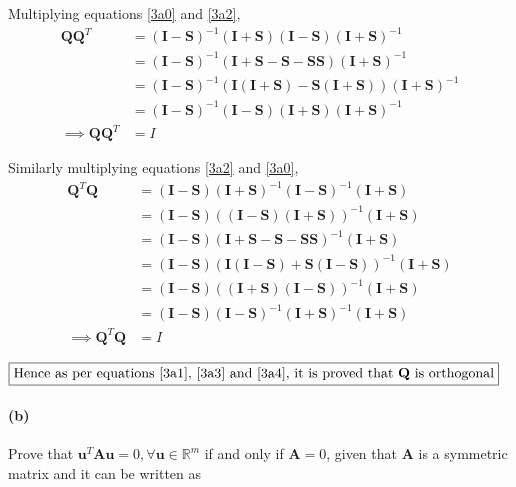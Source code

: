 \documentclass[12pt, letterpaper]{article}
\begin{document}
Multiplying equations \ref{3a0} and \ref{3a2},
\begin{equation}\label{3a3}
  \begin{split}
    \mathbf{Q}\mathbf{Q}^T
    &= (\mathbf{I} - \mathbf{S})^{-1}(\mathbf{I} + \mathbf{S})(\mathbf{I} - \mathbf{S})(\mathbf{I} + \mathbf{S})^{-1}\\
    &= (\mathbf{I} - \mathbf{S})^{-1}(\mathbf{I} + \mathbf{S} - \mathbf{S} - \mathbf{S}\mathbf{S})(\mathbf{I} + \mathbf{S})^{-1}\\
    &= (\mathbf{I} - \mathbf{S})^{-1}(\mathbf{I}(\mathbf{I} + \mathbf{S}) - \mathbf{S}(\mathbf{I} + \mathbf{S}))(\mathbf{I} + \mathbf{S})^{-1}\\
    &= (\mathbf{I} - \mathbf{S})^{-1}(\mathbf{I} - \mathbf{S})(\mathbf{I} + \mathbf{S})(\mathbf{I} + \mathbf{S})^{-1}\\
    \implies \mathbf{QQ}^T &= I
  \end{split}
\end{equation}

Similarly multiplying equations \ref{3a2} and \ref{3a0},
\begin{equation}\label{3a4}
  \begin{split}
    \mathbf{Q}^T\mathbf{Q}
    &= (\mathbf{I} - \mathbf{S})(\mathbf{I} + \mathbf{S})^{-1}(\mathbf{I} - \mathbf{S})^{-1}(\mathbf{I} + \mathbf{S})\\
    &= (\mathbf{I} - \mathbf{S})((\mathbf{I} - \mathbf{S})(\mathbf{I} + \mathbf{S}))^{-1}(\mathbf{I} + \mathbf{S})\\
    &= (\mathbf{I} - \mathbf{S})(\mathbf{I} + \mathbf{S} -\mathbf{S} - \mathbf{SS})^{-1}(\mathbf{I} + \mathbf{S})\\
    &= (\mathbf{I} - \mathbf{S})(\mathbf{I}(\mathbf{I} - \mathbf{S}) + \mathbf{S}(\mathbf{I} - \mathbf{S}))^{-1}(\mathbf{I} + \mathbf{S})\\
    &= (\mathbf{I} - \mathbf{S})((\mathbf{I} + \mathbf{S})(\mathbf{I} - \mathbf{S}))^{-1}(\mathbf{I} + \mathbf{S})\\
    &= (\mathbf{I} - \mathbf{S})(\mathbf{I} - \mathbf{S})^{-1}(\mathbf{I} + \mathbf{S})^{-1}(\mathbf{I} + \mathbf{S})\\
    \implies \mathbf{Q}^T\mathbf{Q} &= I
  \end{split}
\end{equation}

$\boxed{\text{Hence as per equations \ref{3a1}, \ref{3a3} and \ref{3a4}, it is proved that \textbf{Q} is orthogonal}}$

\paragraph{(b)} Prove that $\mathbf{u}^T\mathbf{Au} = 0, \forall \mathbf{u} \in \mathbb{R}^m$ if and only if $\mathbf{A} = 0$, given that $\mathbf{A}$ is a symmetric matrix and it can be written as
\end{document}
